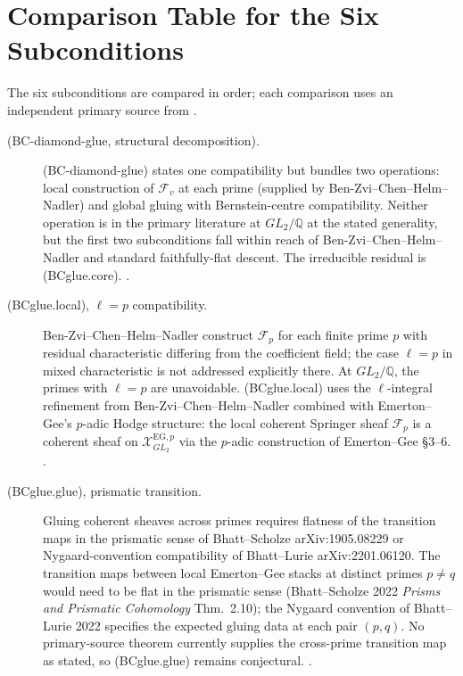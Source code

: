 \section{Comparison Table for the Six Subconditions}
\label{v4-arith:bcglue-k5:table}

The six subconditions are compared in order; each comparison uses an
independent primary source from .

\begin{description}
\item[(BC-diamond-glue, structural decomposition).]
(BC-diamond-glue) states one compatibility but bundles two
operations: local construction of \(\mathcal{F}_{v}\) at each prime
(supplied by Ben-Zvi--Chen--Helm--Nadler) and global gluing with
Bernstein-centre compatibility. Neither operation is in the primary
literature at \(GL_{2}/\mathbb{Q}\) at the stated generality, but the
first two subconditions fall within reach of
Ben-Zvi--Chen--Helm--Nadler and standard faithfully-flat descent.
The irreducible residual is (BCglue.core).
.

\item[(BCglue.local), \(\ell=p\) compatibility.] Ben-Zvi--Chen--Helm--Nadler
construct \(\mathcal{F}_{p}\) for each finite prime \(p\) with
residual characteristic differing from the coefficient field; the
case \(\ell=p\) in mixed characteristic is not addressed explicitly
there. At \(GL_{2}/\mathbb{Q}\), the primes with \(\ell=p\) are
unavoidable. (BCglue.local) uses the
\(\ell\)-integral refinement from Ben-Zvi--Chen--Helm--Nadler combined
with Emerton--Gee's \(p\)-adic Hodge structure: the local coherent
Springer sheaf \(\mathcal{F}_{p}\) is a coherent sheaf on
\(\mathcal{X}^{\mathrm{EG},p}_{GL_{2}}\) via the \(p\)-adic
construction of Emerton--Gee \S3--6.
.

\item[(BCglue.glue), prismatic transition.] Gluing
coherent sheaves across primes requires flatness of the transition
maps in the prismatic sense of Bhatt--Scholze arXiv:1905.08229 or
Nygaard-convention compatibility of Bhatt--Lurie arXiv:2201.06120.
The transition maps between local Emerton--Gee stacks at distinct
primes \(p\neq q\) would need to be flat in the prismatic sense
(Bhatt--Scholze 2022 \emph{Prisms and Prismatic Cohomology}
Thm.~2.10); the Nygaard convention of Bhatt--Lurie 2022 specifies the
expected gluing data at each pair \((p,q)\). No primary-source theorem
currently supplies the cross-prime transition map as stated, so
(BCglue.glue) remains conjectural.
.


\end{description}
